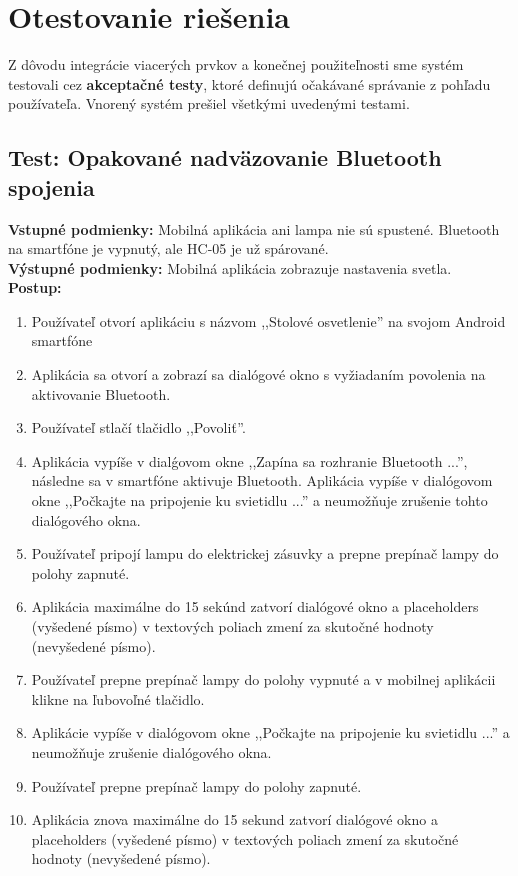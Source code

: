\documentclass[12pt, a4paper]{article}
\begin{document}
\section{Otestovanie riešenia}
Z dôvodu integrácie viacerých prvkov a konečnej použiteľnosti sme systém testovali cez \textbf{akceptačné testy}, ktoré definujú očakávané správanie z pohľadu používateľa. Vnorený systém prešiel všetkými uvedenými testami.
\vspace{1em}

\subsection{Test: Opakované nadväzovanie Bluetooth spojenia}
\noindent\textbf{Vstupné podmienky:} Mobilná aplikácia ani lampa nie sú spustené. Bluetooth na smartfóne je vypnutý, ale HC-05 je už spárované. \\
\textbf{Výstupné podmienky:} Mobilná aplikácia zobrazuje nastavenia svetla. \\
\textbf{Postup:}
\begin{enumerate}
\itemsep0pt
\item Používateľ otvorí aplikáciu s názvom ,,Stolové osvetlenie'' na svojom Android smartfóne
\item Aplikácia sa otvorí a zobrazí sa dialógové okno s vyžiadaním povolenia na aktivovanie Bluetooth.
\item Používateľ stlačí tlačidlo ,,Povoliť''.
\item Aplikácia vypíše v dialǵovom okne ,,Zapína sa rozhranie Bluetooth ...'', následne sa v smartfóne aktivuje Bluetooth. Aplikácia vypíše v dialógovom okne ,,Počkajte na pripojenie ku svietidlu ...'' a neumožňuje zrušenie tohto dialógového okna.
\item Používateľ pripojí lampu do elektrickej zásuvky a prepne prepínač lampy do polohy zapnuté.
\item Aplikácia maximálne do 15 sekúnd zatvorí dialógové okno a placeholders (vyšedené písmo) v textových poliach zmení za skutočné hodnoty (nevyšedené písmo).
\item Používateľ prepne prepínač lampy do polohy vypnuté a v mobilnej aplikácii klikne na ľubovoľné tlačidlo.
\item Aplikácie vypíše v dialógovom okne ,,Počkajte na pripojenie ku svietidlu ...'' a neumožňuje zrušenie dialógového okna.
\item Používateľ prepne prepínač lampy do polohy zapnuté.
\item Aplikácia znova maximálne do 15 sekund zatvorí dialógové okno a placeholders (vyšedené písmo) v textových poliach zmení za skutočné hodnoty (nevyšedené písmo).
\end{enumerate}
\end{document}
